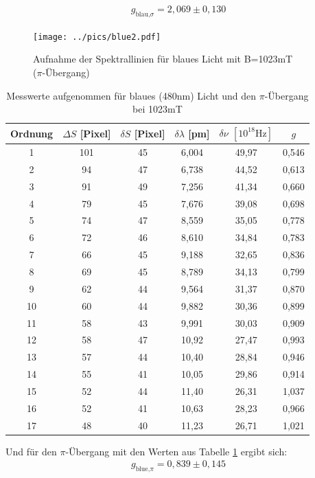 \begin{align*}
g_{\text{blau,}\sigma}=2,069\pm0,130
\end{align*}
\begin{figure}[H]
\texttt{[image: ../pics/blue2.pdf]}
\caption{Aufnahme der Spektrallinien für blaues Licht mit B=1023mT \\($\pi$-Übergang)}
\label{pic_blue1}
\end{figure}
\begin{table}[H]
    \begin{tabular}{|c|c|c|c|c|c|}
        Ordnung & $\Delta S$ [Pixel]    & $\delta S$ [Pixel]    &$\delta \lambda$ [pm]  & $\delta \nu$ $[10^{18}\text{Hz}]$ &   $g$\\\hline
        1&  101&   45&  6,004&  49,97&  0,546\\\hline
        2&  94& 47& 6,738&  44,52&  0,613\\\hline
        3&  91& 49& 7,256&  41,34&  0,660\\\hline
        4&  79& 45& 7,676&  39,08&  0,698\\\hline
        5&  74& 47& 8,559&  35,05&  0,778\\\hline
        6&  72& 46& 8,610&  34,84&  0,783\\\hline
        7&  66& 45& 9,188&  32,65&  0,836\\\hline
        8&  69& 45& 8,789&  34,13&  0,799\\\hline
        9&  62& 44& 9,564&  31,37&  0,870\\\hline
        10& 60& 44& 9,882&  30,36&  0,899\\\hline
        11& 58& 43& 9,991&  30,03&  0,909\\\hline
        12& 58& 47& 10,92&  27,47&  0,993\\\hline
        13& 57& 44& 10,40&  28,84&  0,946\\\hline
        14& 55& 41& 10,05&  29,86&  0,914\\\hline
        15& 52& 44& 11,40&  26,31&  1,037\\\hline
        16& 52& 41& 10,63&  28,23&  0,966\\\hline
        17& 48& 40& 11,23&  26,71&  1,021\\\hline
    \end{tabular}
    \caption{Messwerte aufgenommen für blaues (480nm) Licht und den $\pi$-Übergang bei 1023mT}
    \label{tab_blue_pi}
\end{table}

Und für den $\pi$-Übergang mit den Werten aus Tabelle \ref{tab_blue_pi} ergibt sich:
\begin{align*}
g_{\text{blue,}\pi}=0,839\pm0,145
\end{align*}

